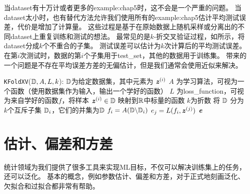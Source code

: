 当\gls{dataset}有十万计或者更多的\gls{example:chap5}时，这不会是一个严重的问题。
当\gls{dataset}太小时，也有替代方法允许我们使用所有的\gls{example:chap5}估计平均测试误差，代价是增加了计算量。
这些过程是基于在原始数据上随机采样或分离出的不同\gls{dataset}上重复训练和测试的想法。
最常见的是$k$-折交叉验证过程，如所示，将\gls{dataset}分成$k$个不重合的子集。
测试误差可以估计为$k$次计算后的平均测试误差。
在第$i$次测试时，数据的第$i$个子集用于\gls{test_set}，其他的数据用于训练集。
带来的一个问题是不存在平均误差方差的无偏估计\citep{Bengio-Grandvalet-JMLR-04}，但是我们通常会使用近似来解决。

\begin{algorithm}
  \caption{$k$-折交叉验证算法。
当给定数据集$\SetD$对于简单的训练/测试或训练/验证分割而言太小难以产生泛化误差的准确估计时（因为在小的测试集上，$L$可能具有过高的方差），$k$-折交叉验证算法可以用于估计学习算法$A$的泛化误差。
数据集$\SetD$包含的元素是抽象的样本 $\Vz^{(i)}$（对于第$i$个样本），在\gls{supervised_learning}的情况代表（输入，目标）对$\Vz^{(i)} = (\Vx^{(i)}, y^{(i)})$ ，或者\gls{unsupervised_learning}的情况下仅用于输入$\Vz^{(i)} = \Vx^{(i)}$。
该算法返回$\SetD$中每个示例的误差向量$\Ve$，其均值是估计的泛化误差。
单个样本上的误差可用于计算平均值周围的置信区间（）。
虽然这些置信区间在使用交叉验证之后不能很好地证明，但是通常的做法是只有当算法$A$误差的置信区间低于并且不与算法$B$的置信区间相交时，我们才声明算法$A$比算法$B$更好。}
\label{alg:xv}
\begin{algorithmic}
\item[] \hspace*{-4.2mm}{\bf Define} {\tt KFoldXV}($\mathbb{D},A,L,k$):
\REQUIRE $\SetD$为给定数据集，其中元素为 $\Vz^{(i)}$
\REQUIRE $A$ 为学习算法，可视为一个函数（使用数据集作为输入，输出一个学好的函数）
\REQUIRE $L$ 为\gls{loss_function}，可视为来自学好的函数$f$，将样本 $\boldsymbol{\mathit{z}}^{(i)} \in \mathbb{D}$ 映射到$\mathbb{R}$中标量的函数
\REQUIRE $k$为折数
\STATE 将 $\SetD$ 分为 $k$个互斥子集 $\mathbb{D}_i$，它们的并集为$\SetD$
  \STATE $f_i = A(\mathbb{D} \backslash \mathbb{D}_i)$ 
    \STATE $e_j = L(f_i, \boldsymbol{\mathit{z}}^{(j)})$
  \ENDFOR
\ENDFOR
{} $\Ve$
\end{algorithmic}
\end{algorithm}

\section{估计、偏差和方差}
\label{sec:estimators_bias_and_variance}
统计领域为我们提供了很多工具来实现\gls{ML}目标，不仅可以解决训练集上的任务，还可以泛化。
基本的概念，例如参数估计、偏差和方差，对于正式地刻画泛化、欠拟合和过拟合都非常有帮助。

